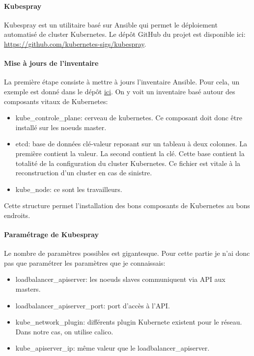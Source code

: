 \documentclass[12pt]{article}
\begin{document}
\paragraph{Kubespray}
Kubespray est un utilitaire basé sur Ansible qui permet le déploiement automatisé de cluster Kubernetes.
Le dépôt GitHub du projet est disponible ici: \url{https://github.com/kubernetes-sigs/kubespray}.

\paragraph{Mise à jours de l'inventaire}
La première étape consiste à mettre à jours l'inventaire Ansible.
Pour cela, un exemple est donné dans le dépôt \href{https://github.com/kubernetes-sigs/kubespray/blob/master/inventory/sample/inventory.ini}{ici}.
On y voit un inventaire basé autour des composants vitaux de Kubernetes:
\begin{itemize}
    \item kube_controle_plane: cerveau de kubernetes.
    Ce composant doit donc être installé sur les noeuds master.
    \item etcd: base de données clé-valeur reposant sur un tableau à deux colonnes.
    La première contient la valeur.
    La second contient la clé.
    Cette base contient la totalité de la configuration du cluster Kubernetes.
    Ce fichier est vitale à la reconstruction d'un cluster en cas de sinistre.
    \item kube_node: ce sont les travailleurs.
\end{itemize}

Cette structure permet l'installation des bons composants de Kubernetes au bons endroits.

\paragraph{Paramétrage de Kubespray}
Le nombre de paramètres possibles est gigantesque.
Pour cette partie je n'ai donc pas que paramétrer les paramètres que je connaissais:
\begin{itemize}
    \item loadbalancer_apiserver: les noeuds slaves communiquent via API aux masters.
    \item loadbalancer_apiserver_port: port d'accès à l'API.
    \item kube_network_plugin: différents plugin Kubernete existent pour le réseau.
    Dans notre cas, on utilise calico.
    \item kube_apiserver_ip: même valeur que le loadbalancer_apiserver.
\end{itemize}
\end{document}
